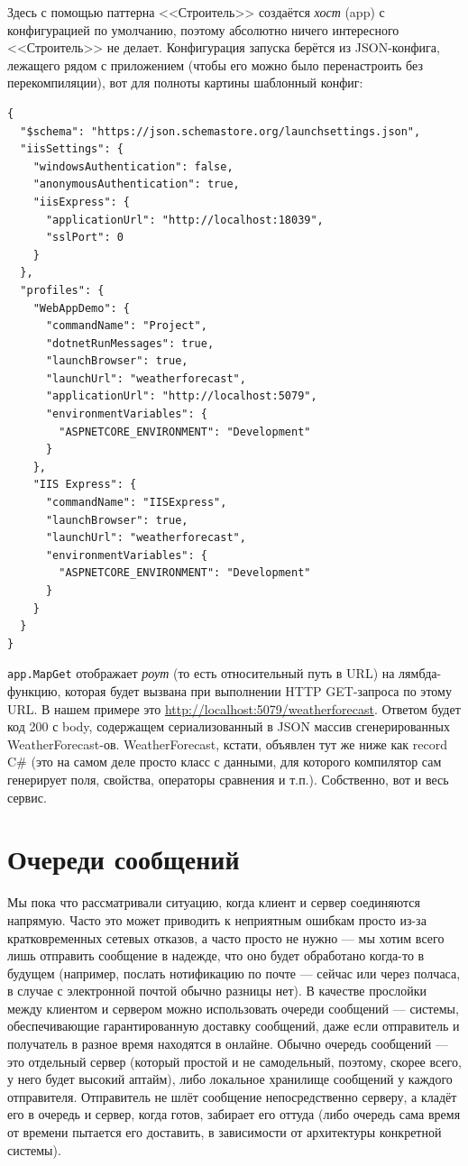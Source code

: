 \documentclass{../../text-style}
\begin{document}
Здесь с помощью паттерна <<Строитель>> создаётся \emph{хост} (app) с конфигурацией по умолчанию, поэтому абсолютно ничего интересного <<Строитель>> не делает. Конфигурация запуска берётся из JSON-конфига, лежащего рядом с приложением (чтобы его можно было перенастроить без перекомпиляции), вот для полноты картины шаблонный конфиг:

\begin{footnotesize}
    \begin{verbatim}
{
  "$schema": "https://json.schemastore.org/launchsettings.json",
  "iisSettings": {
    "windowsAuthentication": false,
    "anonymousAuthentication": true,
    "iisExpress": {
      "applicationUrl": "http://localhost:18039",
      "sslPort": 0
    }
  },
  "profiles": {
    "WebAppDemo": {
      "commandName": "Project",
      "dotnetRunMessages": true,
      "launchBrowser": true,
      "launchUrl": "weatherforecast",
      "applicationUrl": "http://localhost:5079",
      "environmentVariables": {
        "ASPNETCORE_ENVIRONMENT": "Development"
      }
    },
    "IIS Express": {
      "commandName": "IISExpress",
      "launchBrowser": true,
      "launchUrl": "weatherforecast",
      "environmentVariables": {
        "ASPNETCORE_ENVIRONMENT": "Development"
      }
    }
  }
}
    \end{verbatim}
\end{footnotesize}

\verb|app.MapGet| отображает \emph{роут} (то есть относительный путь в URL) на лямбда-функцию, которая будет вызвана при выполнении HTTP GET-запроса по этому URL. В нашем примере это \url{http://localhost:5079/weatherforecast}. Ответом будет код 200 с body, содержащем сериализованный в JSON массив сгенерированных WeatherForecast-ов. WeatherForecast, кстати, объявлен тут же ниже как record C\# (это на самом деле просто класс с данными, для которого компилятор сам генерирует поля, свойства, операторы сравнения и т.п.). Собственно, вот и весь сервис.

\section{Очереди сообщений}

Мы пока что рассматривали ситуацию, когда клиент и сервер соединяются напрямую. Часто это может приводить к неприятным ошибкам просто из-за кратковременных сетевых отказов, а часто просто не нужно --- мы хотим всего лишь отправить сообщение в надежде, что оно будет обработано когда-то в будущем (например, послать нотификацию по почте --- сейчас или через полчаса, в случае с электронной почтой обычно разницы нет). В качестве прослойки между клиентом и сервером можно использовать очереди сообщений --- системы, обеспечивающие гарантированную доставку сообщений, даже если отправитель и получатель в разное время находятся в онлайне. Обычно очередь сообщений --- это отдельный сервер (который простой и не самодельный, поэтому, скорее всего, у него будет высокий аптайм), либо локальное хранилище сообщений у каждого отправителя. Отправитель не шлёт сообщение непосредственно серверу, а кладёт его в очередь и сервер, когда готов, забирает его оттуда (либо очередь сама время от времени пытается его доставить, в зависимости от архитектуры конкретной системы).
\end{document}

